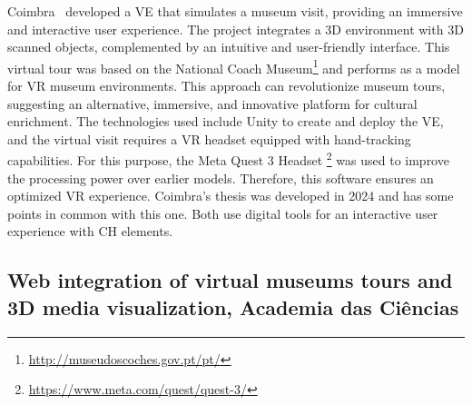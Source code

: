 Coimbra~\cite{tese_tourCoimbra2024} developed a \gls{VE} that simulates a museum visit, providing an immersive and interactive user experience. The project integrates a \gls{3D} environment 
with \gls{3D} scanned objects, complemented by an intuitive and user-friendly interface. 
This virtual tour was based on the National Coach Museum\footnote{\url{http://museudoscoches.gov.pt/pt/}} and performs as a model for \gls{VR} museum environments. This approach can revolutionize 
museum tours, suggesting an alternative, immersive, and innovative platform for cultural enrichment. 
The technologies used include Unity to create and deploy the \gls{VE}, and the virtual visit requires a \gls{VR} headset equipped with hand-tracking capabilities. For this purpose, 
the Meta Quest 3 Headset \footnote{\url{https://www.meta.com/quest/quest-3/}} was used to improve the processing power over earlier models. Therefore, this software ensures an optimized \gls{VR} experience. 
Coimbra's thesis was developed in 2024 and has some points in common with this one. Both use digital tools for an interactive user experience with \gls{CH} elements.


\subsection{Web integration of virtual museums tours and \gls{3D} media visualization, Academia das Ciências}
\label{sec:thesis3_nova}

